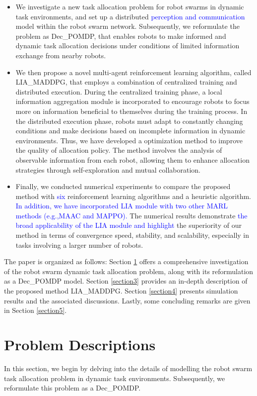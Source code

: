 \documentclass[lettersize,journal]{IEEEtran}
\newcommand{\blue}[1]{\textcolor{blue}{#1}}
\begin{document}
\begin{itemize}
\item We investigate a new task allocation problem for robot swarms in dynamic task environments, and  set up a distributed \blue{perception and communication} model within the robot swarm network. Subsequently,  we reformulate the problem as Dec\_POMDP, that enables robots to make informed and dynamic task allocation decisions under conditions of limited information exchange  from nearby robots. 
\item  We  then propose  a novel multi-agent reinforcement learning algorithm, called LIA\_MADDPG,  that employs a combination of centralized training and distributed execution. During the centralized training phase, a local information aggregation module is incorporated to encourage robots to focus more on information beneficial to themselves during the training process. In the distributed execution phase,  robots must adapt to constantly changing conditions and make decisions based on incomplete information in dynamic environments. Thus, we  have developed a optimization method  to improve the quality of allocation policy. The method involves the analysis of observable information from each robot, allowing them to enhance allocation strategies through self-exploration and mutual collaboration. 
\item Finally, we conducted numerical experiments to compare the proposed method with \blue{six} reinforcement learning algorithms and a heuristic algorithm. \blue{In addition,
we have incorporated LIA module with two other MARL methods (e.g.,MAAC and MAPPO).} The numerical results demonstrate \blue{the broad applicability of the LIA module and highlight} the superiority of our method in terms of convergence speed, stability, and scalability, especially in tasks involving a larger number of robots. 
\end{itemize}

The  paper is organized as follows: Section \ref{section2} offers a comprehensive investigation of the robot swarm dynamic task allocation problem, along with its  reformulation as a Dec\_POMDP model. Section \ref{section3}  provides  an in-depth description of the proposed method LIA\_MADDPG. Section \ref{section4} presents simulation results and the associated discussions. Lastly, some concluding remarks are given in Section \ref{section5}.   

\section{Problem Descriptions}\label{section2}
In this section, we begin by delving into the details of modelling the robot swarm task allocation problem in dynamic task environments. Subsequently, we reformulate this problem as a Dec\_POMDP. 
\end{document}
